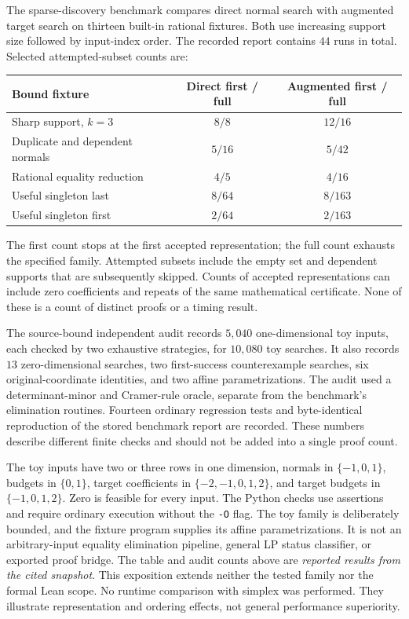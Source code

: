 \documentclass[11pt,letterpaper]{article}
\theoremstyle{definition}
\theoremstyle{remark}
\numberwithin{equation}{section}
\begin{document}
The sparse-discovery benchmark compares direct normal search with augmented
target search on thirteen built-in rational fixtures. Both use increasing
support size followed by input-index order. The recorded report contains
\(44\) runs in total. Selected attempted-subset counts are:
\begin{center}
\begin{tabular}{@{}lcc@{}}
\toprule
Bound fixture & Direct first / full & Augmented first / full\\
\midrule
Sharp support, \(k=3\) & \(8/8\) & \(12/16\)\\
Duplicate and dependent normals & \(5/16\) & \(5/42\)\\
Rational equality reduction & \(4/5\) & \(4/16\)\\
Useful singleton last & \(8/64\) & \(8/163\)\\
Useful singleton first & \(2/64\) & \(2/163\)\\
\bottomrule
\end{tabular}
\end{center}
The first count stops at the first accepted representation; the full count
exhausts the specified family. Attempted subsets include the empty set and
dependent supports that are subsequently skipped. Counts of accepted
representations can include zero coefficients and repeats of the same
mathematical certificate. None of these is a count of distinct proofs
or a timing result.

The source-bound independent audit records \(5{,}040\) one-dimensional toy
inputs, each checked by two exhaustive strategies, for \(10{,}080\)
toy searches. It also records \(13\) zero-dimensional searches, two
first-success counterexample searches, six original-coordinate identities,
and two affine parametrizations. The audit used a determinant-minor and
Cramer-rule oracle, separate from the benchmark's elimination routines.
Fourteen ordinary regression tests and byte-identical reproduction of the
stored benchmark report are recorded. These numbers describe different
finite checks and should not be added into a single proof count.

The toy inputs have two or three rows in one dimension, normals in
\(\{-1,0,1\}\), budgets in \(\{0,1\}\), target coefficients in
\(\{-2,-1,0,1,2\}\), and target budgets in \(\{-1,0,1,2\}\).
Zero is feasible for every input. The Python checks use assertions and require
ordinary execution without the \texttt{-O} flag.
The toy family is deliberately bounded, and the fixture program supplies
its affine parametrizations. It is not an arbitrary-input equality
elimination pipeline, general LP status classifier, or exported proof bridge.
The table and audit counts above are \emph{reported results from the cited
snapshot}. This exposition extends neither the tested family nor the formal
Lean scope. No runtime comparison with simplex was performed.
They illustrate representation and ordering effects, not general performance
superiority.
\end{document}
